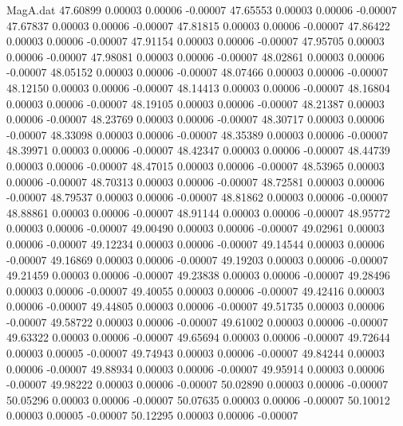 \begin{filecontents}{MagA.dat}
  47.60899    0.00003    0.00006   -0.00007
  47.65553    0.00003    0.00006   -0.00007
  47.67837    0.00003    0.00006   -0.00007
  47.81815    0.00003    0.00006   -0.00007
  47.86422    0.00003    0.00006   -0.00007
  47.91154    0.00003    0.00006   -0.00007
  47.95705    0.00003    0.00006   -0.00007
  47.98081    0.00003    0.00006   -0.00007
  48.02861    0.00003    0.00006   -0.00007
  48.05152    0.00003    0.00006   -0.00007
  48.07466    0.00003    0.00006   -0.00007
  48.12150    0.00003    0.00006   -0.00007
  48.14413    0.00003    0.00006   -0.00007
  48.16804    0.00003    0.00006   -0.00007
  48.19105    0.00003    0.00006   -0.00007
  48.21387    0.00003    0.00006   -0.00007
  48.23769    0.00003    0.00006   -0.00007
  48.30717    0.00003    0.00006   -0.00007
  48.33098    0.00003    0.00006   -0.00007
  48.35389    0.00003    0.00006   -0.00007
  48.39971    0.00003    0.00006   -0.00007
  48.42347    0.00003    0.00006   -0.00007
  48.44739    0.00003    0.00006   -0.00007
  48.47015    0.00003    0.00006   -0.00007
  48.53965    0.00003    0.00006   -0.00007
  48.70313    0.00003    0.00006   -0.00007
  48.72581    0.00003    0.00006   -0.00007
  48.79537    0.00003    0.00006   -0.00007
  48.81862    0.00003    0.00006   -0.00007
  48.88861    0.00003    0.00006   -0.00007
  48.91144    0.00003    0.00006   -0.00007
  48.95772    0.00003    0.00006   -0.00007
  49.00490    0.00003    0.00006   -0.00007
  49.02961    0.00003    0.00006   -0.00007
  49.12234    0.00003    0.00006   -0.00007
  49.14544    0.00003    0.00006   -0.00007
  49.16869    0.00003    0.00006   -0.00007
  49.19203    0.00003    0.00006   -0.00007
  49.21459    0.00003    0.00006   -0.00007
  49.23838    0.00003    0.00006   -0.00007
  49.28496    0.00003    0.00006   -0.00007
  49.40055    0.00003    0.00006   -0.00007
  49.42416    0.00003    0.00006   -0.00007
  49.44805    0.00003    0.00006   -0.00007
  49.51735    0.00003    0.00006   -0.00007
  49.58722    0.00003    0.00006   -0.00007
  49.61002    0.00003    0.00006   -0.00007
  49.63322    0.00003    0.00006   -0.00007
  49.65694    0.00003    0.00006   -0.00007
  49.72644    0.00003    0.00005   -0.00007
  49.74943    0.00003    0.00006   -0.00007
  49.84244    0.00003    0.00006   -0.00007
  49.88934    0.00003    0.00006   -0.00007
  49.95914    0.00003    0.00006   -0.00007
  49.98222    0.00003    0.00006   -0.00007
  50.02890    0.00003    0.00006   -0.00007
  50.05296    0.00003    0.00006   -0.00007
  50.07635    0.00003    0.00006   -0.00007
  50.10012    0.00003    0.00005   -0.00007
  50.12295    0.00003    0.00006   -0.00007

\end{filecontents}

